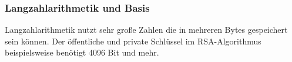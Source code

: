 \subsubsection{Langzahlarithmetik und Basis}
Langzahlarithmetik nutzt sehr große Zahlen die in mehreren Bytes gespeichert sein können. Der öffentliche und private
Schlüssel im RSA-Algorithmus beispielsweise benötigt 4096 Bit und mehr.
\DEph{}


